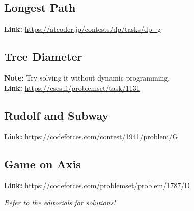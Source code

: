 \documentclass[12pt]{article}
\begin{document}
\subsection{Longest Path}
\textbf{Link:} \url{https://atcoder.jp/contests/dp/tasks/dp_g}

\subsection{Tree Diameter}
\textbf{Note:} Try solving it without dynamic programming. \\
\textbf{Link:} \url{https://cses.fi/problemset/task/1131}

\subsection{Rudolf and Subway}
\textbf{Link:} \url{https://codeforces.com/contest/1941/problem/G}

\subsection{Game on Axis}
\textbf{Link:} \url{https://codeforces.com/problemset/problem/1787/D}


\begin{center}
    \textit{Refer to the editorials for solutions!}
\end{center}
\end{document}
